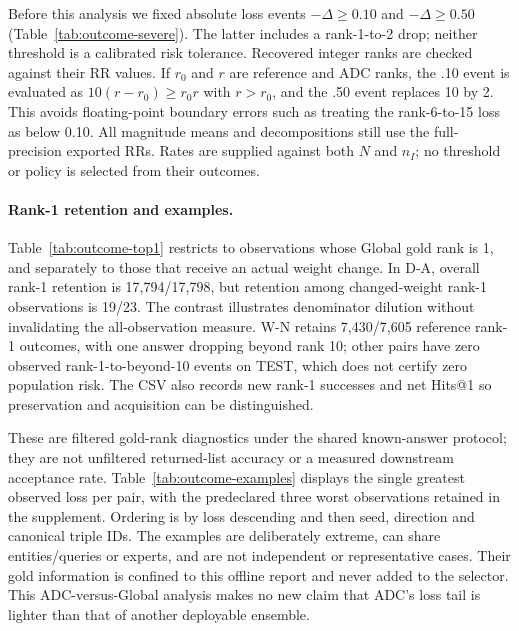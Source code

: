 \documentclass[11pt,a4paper]{article}
\begin{document}
Before this analysis we fixed absolute loss events $-\Delta\geq0.10$ and $-\Delta\geq0.50$ (Table~\ref{tab:outcome-severe}). The latter includes a rank-1-to-2 drop; neither threshold is a calibrated risk tolerance. Recovered integer ranks are checked against their RR values. If $r_0$ and $r$ are reference and ADC ranks, the .10 event is evaluated as $10(r-r_0)\geq r_0r$ with $r>r_0$, and the .50 event replaces 10 by 2. This avoids floating-point boundary errors such as treating the rank-6-to-15 loss as below 0.10. All magnitude means and decompositions still use the full-precision exported RRs. Rates are supplied against both $N$ and $n_I$; no threshold or policy is selected from their outcomes.


\paragraph{Rank-1 retention and examples.}
Table~\ref{tab:outcome-top1} restricts to observations whose Global gold rank is 1, and separately to those that receive an actual weight change. In D-A, overall rank-1 retention is 17,794/17,798, but retention among changed-weight rank-1 observations is 19/23. The contrast illustrates denominator dilution without invalidating the all-observation measure. W-N retains 7,430/7,605 reference rank-1 outcomes, with one answer dropping beyond rank 10; other pairs have zero observed rank-1-to-beyond-10 events on TEST, which does not certify zero population risk. The CSV also records new rank-1 successes and net Hits@1 so preservation and acquisition can be distinguished.


These are filtered gold-rank diagnostics under the shared known-answer protocol; they are not unfiltered returned-list accuracy or a measured downstream acceptance rate. Table~\ref{tab:outcome-examples} displays the single greatest observed loss per pair, with the predeclared three worst observations retained in the supplement. Ordering is by loss descending and then seed, direction and canonical triple IDs. The examples are deliberately extreme, can share entities/queries or experts, and are not independent or representative cases. Their gold information is confined to this offline report and never added to the selector. This ADC-versus-Global analysis makes no new claim that ADC's loss tail is lighter than that of another deployable ensemble.

\FloatBarrier
\end{document}
